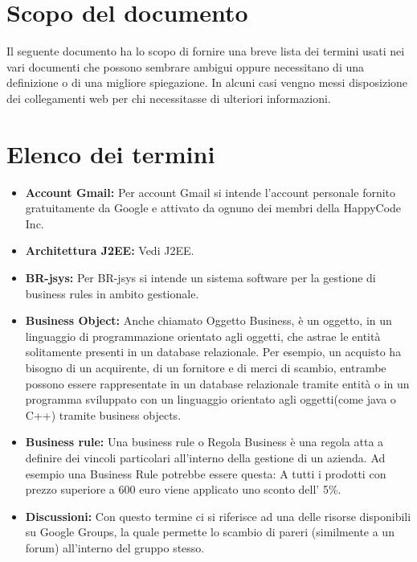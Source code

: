 \documentclass[11pt,titlepage,a4paper]{report}
\begin{document}
\chapter{Scopo del documento}
Il seguente documento ha lo scopo di fornire una breve lista dei termini usati nei vari documenti che possono sembrare ambigui oppure necessitano di una definizione o di una migliore spiegazione. In alcuni casi vengno messi disposizione dei collegamenti web per chi necessitasse di ulteriori informazioni.
\chapter{Elenco dei termini}
\begin{itemize}

\item{\textbf{Account Gmail:}
Per account Gmail si intende l'account personale fornito gratuitamente da Google e attivato da ognuno dei membri della HappyCode Inc.}

\item{\textbf{Architettura J2EE:}
Vedi J2EE.}

\item{\textbf{BR-jsys:}
Per BR-jsys si intende un sistema software per la gestione di business rules in ambito gestionale.}

\item{\textbf{Business Object:}
Anche chiamato Oggetto Business, \`e un oggetto, in un linguaggio di programmazione orientato agli oggetti, che astrae le entit\`a solitamente presenti in un database relazionale.
Per esempio, un acquisto ha bisogno di un acquirente, di un fornitore e di merci di scambio, entrambe possono essere rappresentate in un database relazionale tramite entit\`a o in un programma sviluppato con un linguaggio orientato agli oggetti(come java o C++) tramite business objects.}

\item{\textbf{Business rule:}
Una business rule o Regola Business \`e una regola atta a definire dei vincoli particolari all'interno della gestione di un azienda. Ad esempio una Business Rule potrebbe essere questa: A tutti i prodotti con prezzo superiore a 600 euro  viene applicato uno sconto dell' 5\%.}

\item{\textbf{Discussioni:}
Con questo termine ci si riferisce ad una delle risorse disponibili su Google Groups, la quale permette lo scambio di pareri (similmente a un forum) all'interno del gruppo stesso.}


\end{itemize}
\end{document}
